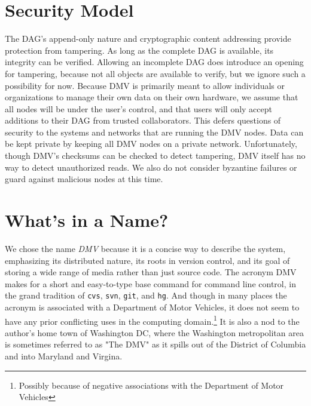 \section{Security Model}
\label{security-model}

The \gls{DAG}'s append-only nature and cryptographic content addressing provide
protection from tampering. As long as the complete \gls{DAG} is available, its
integrity can be verified. Allowing an incomplete \gls{DAG} does introduce an
opening for tampering, because not all objects are available to verify, but we
ignore such a possibility for now. Because \gls{DMV} is primarily meant to allow
individuals or organizations to manage their own data on their own hardware, we
assume that all nodes will be under the user's control, and that users will only
accept additions to their \gls{DAG} from trusted collaborators. This defers
questions of security to the systems and networks that are running the \gls{DMV}
nodes. Data can be kept private by keeping all \gls{DMV} nodes on a private
network. Unfortunately, though \gls{DMV}'s checksums can be checked to detect
tampering, \gls{DMV} itself has no way to detect unauthorized reads. We also do
not consider byzantine failures or guard against malicious nodes at this time.

%


\section{What's in a Name?}

We chose the name \emph{\acrlong{DMV}} because it is a concise way to describe
the system, emphasizing its distributed nature, its roots in version control,
and its goal of storing a wide range of media rather than just source code. The
acronym \gls{DMV} makes for a short and easy-to-type base command for command
line control, in the grand tradition of \lstinline{cvs}, \lstinline{svn},
\lstinline{git}, and \lstinline{hg}. And though in many places the acronym is
associated with a Department of Motor Vehicles, it does not seem to have any
prior conflicting uses in the computing domain.\footnote{Possibly because of
negative associations with the Department of Motor Vehicles} It is also a nod to
the author's home town of Washington DC, where the Washington metropolitan area
is sometimes referred to as "The DMV" as it spills out of the District of
Columbia and into Maryland and Virgina.
